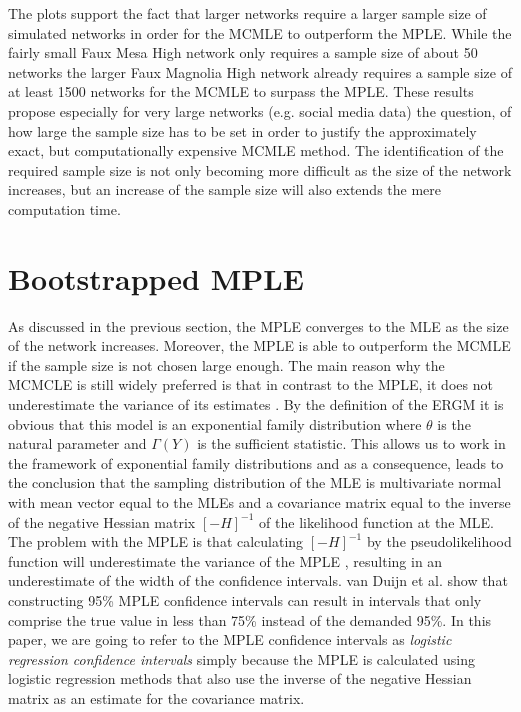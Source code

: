 \documentclass[headsepline=true, abstracton]{scrartcl}
\begin{document}
\noindent The plots support the fact that larger networks require a larger sample size of simulated networks in order for the MCMLE to outperform the MPLE. While the fairly small Faux Mesa High network only requires a sample size of about 50 networks the larger Faux Magnolia High network already requires a sample size of at least 1500 networks for the MCMLE to surpass the MPLE. These results propose especially for very large networks (e.g. social media data) the question, of how large the sample size has to be set in order to justify the approximately exact, but computationally expensive MCMLE method. The identification of the required sample size is not only becoming more difficult as the size of the network increases, but an increase of the sample size will also extends the mere computation time. 


\section*{Bootstrapped MPLE}
As discussed in the previous section, the MPLE converges to the MLE as the size of the network increases. Moreover, the MPLE is able to outperform the MCMLE if the sample size is not chosen large enough. The main reason why the MCMCLE is still widely preferred is that in contrast to the MPLE, it does not underestimate the variance of its estimates \cite{vanDuijnetal2009}. By the definition of the ERGM it is obvious that this model is an exponential family distribution where $\theta$ is the natural parameter and $\Gamma (Y)$ is the sufficient statistic. This allows us to work in the framework of exponential family distributions and as a consequence, leads to the conclusion that the sampling distribution of the MLE is multivariate normal with mean vector equal to the MLEs and a covariance matrix equal to the inverse of the negative Hessian matrix $[-H]^{-1}$ of the likelihood function at the MLE. The problem with the MPLE is that calculating $[-H]^{-1}$ by the pseudolikelihood function will underestimate the variance of the MPLE \cite{vanDuijnetal2009}, resulting in an underestimate of the width of the confidence intervals. van Duijn et al. show that constructing 95\% MPLE confidence intervals can result in intervals that only comprise the true value in less than 75\% instead of the demanded 95\%. In this paper, we are going to refer to the MPLE confidence intervals as \textit{logistic regression confidence intervals} simply because the MPLE is calculated using logistic regression methods that also use the inverse of the negative Hessian matrix as an estimate for the covariance matrix. \\[0.3cm]
\end{document}
